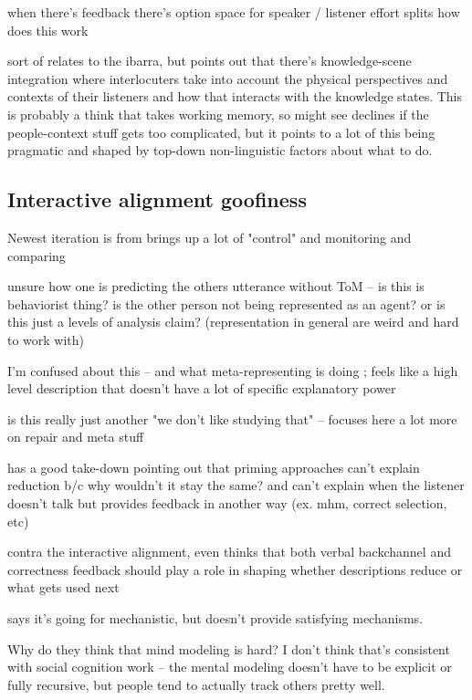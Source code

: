 \documentclass[]{article}
\begin{document}
\cite{yoon2019} when there's feedback there's option space for speaker / listener effort splits how does this work 

sort of relates to the ibarra, but \cite{yoon2019a} points out that there's knowledge-scene integration where interlocuters take into account the physical perspectives and contexts of their listeners and how that interacts with the knowledge states. This is probably a think that takes working memory, so might see declines if the people-context stuff gets too complicated, but it points to a lot of this being pragmatic and shaped by top-down non-linguistic factors about what to do. 

\subsection{Interactive alignment goofiness}


Newest iteration is from \cite{gandolfi2022} brings up a lot of "control" and monitoring and comparing 

unsure how one is predicting the others utterance without ToM -- is this is behaviorist thing? is the other person not being represented as an agent? or is this just a levels of analysis claim? (representation in general are weird and hard to work with)

I'm confused about this -- and what meta-representing is doing ; feels like a high level description that doesn't have a lot of specific explanatory power

is this really just another "we don't like studying that" -- focuses here a lot more on repair and meta stuff 

\cite{hawkins2021} has a good take-down pointing out that priming approaches can't explain reduction b/c why wouldn't it stay the same? and can't explain when the listener doesn't talk but provides feedback in another way (ex. mhm, correct selection, etc) 

contra the interactive alignment, even \cite{krauss1966} thinks that both verbal backchannel and correctness feedback should play a role in shaping whether descriptions reduce or what gets used next 

\cite{pickering2004} says it's going for mechanistic, but doesn't provide satisfying mechanisms. 

Why do they think that mind modeling is hard? I don't think that's consistent with social cognition work -- the mental modeling doesn't have to be explicit or fully recursive, but people tend to actually track others pretty well. 
\end{document}
